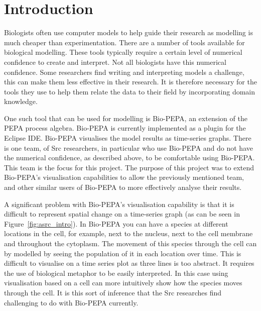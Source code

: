 \section{Introduction}

Biologists often use computer models to help guide their research as modelling is much cheaper than experimentation.  There are a number of tools available for biological modelling.  These tools typically require a certain level of numerical confidence to create and interpret.  Not all biologists have this numerical confidence.  Some researchers find writing and interpreting models a challenge, this can make them less effective in their research.  It is therefore necessary for the tools they use to help them relate the data to their field by incorporating domain knowledge.

One such tool that can be used for modelling is Bio-PEPA, an extension of the PEPA process algebra.  Bio-PEPA is currently implemented as a plugin for the Eclipse IDE.  Bio-PEPA visualises the model results as time-series graphs.  There is one team, of Src researchers, in particular who use Bio-PEPA and do not have the numerical confidence, as described above, to be comfortable using Bio-PEPA.  This team is the focus for this project.  The purpose of this project was to extend Bio-PEPA's visualisation capabilities to allow the previously mentioned team, and other similar users of Bio-PEPA to more effectively analyse their results.

A significant problem with Bio-PEPA's visualisation capability is that it is difficult to represent spatial change on a time-series graph (as can be seen in Figure~\ref{fig:asrc_intro}).  In Bio-PEPA you can have a species at different locations in the cell, for example, next to the nucleus, next to the cell membrane and throughout the cytoplasm.  The movement of this species through the cell can by modelled by seeing the population of it in each location over time.  This is difficult to visualise on a time series plot as three lines is too abstract.  It requires the use of biological metaphor to be easily interpreted.  In this case using visualisation based on a cell can more intuitively show how the species moves through the cell.  It is this sort of inference that the Src researches find challenging to do with Bio-PEPA currently.

